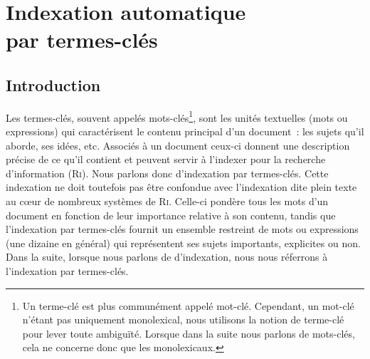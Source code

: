 \chapter[Indexation automatique par termes-clés]{Indexation automatique\\par termes-clés}
\label{chap:main-state_of_the_art}

  \section{Introduction}
  \label{sec:main-state_of_the_art-introduction}
    Les termes-clés,
    souvent appelés mots-clés\footnote{Un terme-clé est plus communément appelé
    mot-clé. Cependant, un mot-clé n'étant pas uniquement monolexical, nous
    utilisons la notion de terme-clé pour lever toute ambiguïté. Lorsque dans la
    suite nous parlons de mots-clés, cela ne concerne donc que les
    monolexicaux.}, sont les unités textuelles (mots ou expressions) qui
    caractérisent le contenu principal d'un document~: les sujets qu'il aborde,
    ses idées, etc. Associés à un document ceux-ci donnent une description
    précise de ce qu'il contient et peuvent servir à l'indexer pour la recherche
    d'information (\textsc{Ri}). Nous parlons donc d'indexation par
    termes-clés. Cette indexation ne doit
    toutefois pas être confondue avec l'indexation dite \og{}plein texte\fg{} au
    c\oe{}ur de nombreux systèmes de \textsc{Ri}. Celle-ci
    pondère tous les mots d'un document en fonction de leur importance relative
    à son contenu, tandis que l'indexation par termes-clés fournit un ensemble
    restreint de mots ou expressions (une dizaine en général) qui représentent
    ses sujets importants, explicites ou non. Dans la suite, lorsque nous
    parlons de d'indexation, nous nous réferrons à l'indexation par termes-clés.

